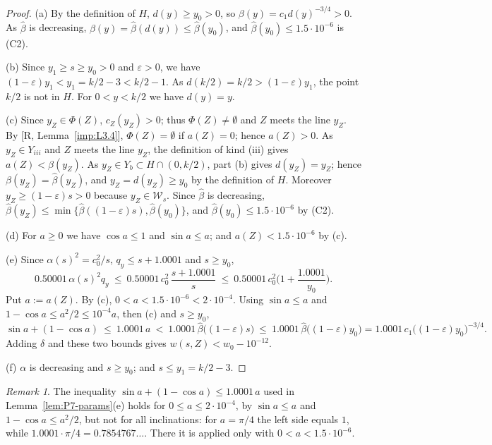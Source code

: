\documentclass[11pt]{amsart}
\newcommand{\eps}{\varepsilon}
\theoremstyle{definition}
\theoremstyle{remark}
\newtheorem{remark}[theorem]{Remark}
\numberwithin{equation}{section}
\begin{document}
\begin{proof}
(a) By the definition of $H$, $d(y)\ge y_0>0$, so $\beta(y)=c_1d(y)^{-3/4}>0$. As $\hat\beta$ is decreasing, $\beta(y)=\hat\beta(d(y))\le\hat\beta(y_0)$, and $\hat\beta(y_0)\le1.5\cdot10^{-6}$ is (C2).

(b) Since $y_1\ge s\ge y_0>0$ and $\eps>0$, we have $(1-\eps)y_1<y_1=k/2-3<k/2-1$. As $d(k/2)=k/2>(1-\eps)y_1$, the point $k/2$ is not in $H$. For $0<y<k/2$ we have $d(y)=y$.

(c) Since $y_Z\in\Phi(Z)$, $c_Z(y_Z)>0$; thus $\Phi(Z)\ne\emptyset$ and $Z$ meets the line $y_Z$. By [R, Lemma~\ref{imp:L3.4}], $\Phi(Z)=\emptyset$ if $a(Z)=0$; hence $a(Z)>0$. As $y_Z\in Y_{iii}$ and $Z$ meets the line $y_Z$, the definition of kind (iii) gives $a(Z)<\beta(y_Z)$. As $y_Z\in Y_b\subset H\cap(0,k/2)$, part (b) gives $d(y_Z)=y_Z$; hence $\beta(y_Z)=\hat\beta(y_Z)$, and $y_Z=d(y_Z)\ge y_0$ by the definition of $H$. Moreover $y_Z\ge(1-\eps)s>0$ because $y_Z\in\mathcal W_s$. Since $\hat\beta$ is decreasing, $\hat\beta(y_Z)\le\min\{\hat\beta((1-\eps)s),\hat\beta(y_0)\}$, and $\hat\beta(y_0)\le1.5\cdot10^{-6}$ by (C2).

(d) For $a\ge0$ we have $\cos a\le1$ and $\sin a\le a$; and $a(Z)<1.5\cdot10^{-6}$ by (c).

(e) Since $\alpha(s)^2=c_0^2/s$, $q_y\le s+1.0001$ and $s\ge y_0$,
\[
0.50001\,\alpha(s)^2q_y\ \le\ 0.50001\,c_0^2\,\frac{s+1.0001}{s}\ \le\ 0.50001\,c_0^2\Big(1+\frac{1.0001}{y_0}\Big).
\]
Put $a:=a(Z)$. By (c), $0<a<1.5\cdot10^{-6}<2\cdot10^{-4}$. Using $\sin a\le a$ and $1-\cos a\le a^2/2\le10^{-4}a$, then (c) and $s\ge y_0$,
\[
\sin a+(1-\cos a)\ \le\ 1.0001\,a\ <\ 1.0001\,\hat\beta\big((1-\eps)s\big)\ \le\ 1.0001\,\hat\beta\big((1-\eps)y_0\big)=1.0001\,c_1\big((1-\eps)y_0\big)^{-3/4}.
\]
Adding $\delta$ and these two bounds gives $w(s,Z)<w_0-10^{-12}$.

(f) $\alpha$ is decreasing and $s\ge y_0$; and $s\le y_1=k/2-3$.
\end{proof}

\begin{remark}\label{rem:P7-sin}
The inequality $\sin a+(1-\cos a)\le1.0001\,a$ used in Lemma~\ref{lem:P7-params}(e) holds for $0\le a\le2\cdot10^{-4}$, by $\sin a\le a$ and $1-\cos a\le a^2/2$, but not for all inclinations: for $a=\pi/4$ the left side equals $1$, while $1.0001\cdot\pi/4=0.7854767\ldots$. There it is applied only with $0<a<1.5\cdot10^{-6}$.
\end{remark}
\end{document}
